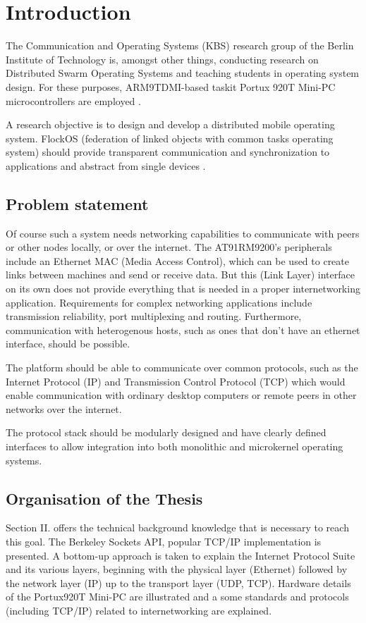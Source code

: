\documentclass[11pt,twoside,abstract,notitlepage]{scrreprt}
\begin{document}
\newpage

\pagestyle{headings}
\chapter{Introduction}
The Communication and Operating Systems (KBS) research group of the Berlin Institute of Technology is, amongst other things, conducting research on Distributed Swarm Operating Systems and teaching students in operating system design. For these purposes, ARM9TDMI-based taskit Portux 920T Mini-PC microcontrollers are employed \cite{taskit}. 

A research objective is to design and develop a distributed mobile operating system. FlockOS (federation of linked objects with common tasks operating system) should provide transparent communication and synchronization to applications and abstract from single devices \cite{flockos}.

\section{Problem statement}
Of course such a system needs networking capabilities to communicate with peers or other nodes locally, or over the internet. The AT91RM9200's peripherals include an Ethernet MAC (Media Access Control), which can be used to create links between machines and send or receive data. But this (Link Layer) interface on its own does not provide everything that is needed in a proper internetworking application. Requirements for complex networking applications include transmission reliability, port multiplexing and routing. Furthermore, communication with heterogenous hosts, such as ones that don't have an ethernet interface, should be possible.  

The platform should be able to communicate over common protocols, such as the Internet Protocol (IP) and Transmission Control Protocol (TCP) which would enable communication with ordinary desktop computers or remote peers in other networks over the internet.

The protocol stack should be modularly designed and have clearly defined interfaces to allow integration into both monolithic and microkernel operating systems. 

\section{Organisation of the Thesis}
Section II. offers the technical background knowledge that is necessary to reach this goal. The Berkeley Sockets API, popular TCP/IP implementation is presented. 
A bottom-up approach is taken to explain the Internet Protocol Suite and its various layers, beginning with the physical layer (Ethernet) followed by the network layer (IP) up to the transport layer (UDP, TCP). Hardware details of the Portux920T Mini-PC are illustrated and a some standards and protocols (including TCP/IP) related to internetworking are explained.
\end{document}
